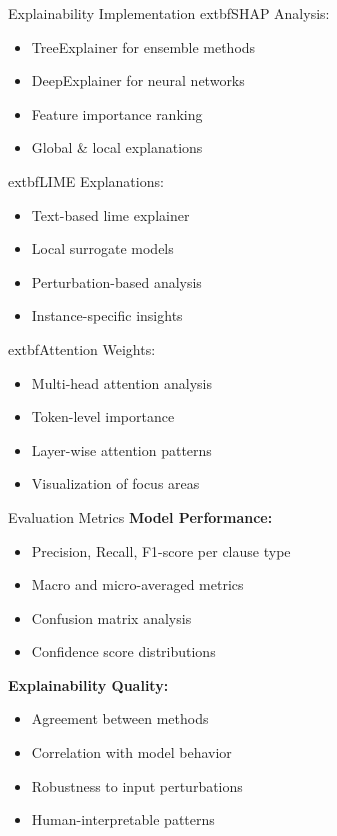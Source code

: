 \begin{frame}{Explainability Implementation}
	extbf{SHAP Analysis:}
\begin{itemize}
    \item TreeExplainer for ensemble methods
    \item DeepExplainer for neural networks
    \item Feature importance ranking
    \item Global \& local explanations
\end{itemize}

\vspace{0.3cm}
	extbf{LIME Explanations:}
\begin{itemize}
    \item Text-based lime explainer
    \item Local surrogate models  
    \item Perturbation-based analysis
    \item Instance-specific insights
\end{itemize}

\vspace{0.3cm}
	extbf{Attention Weights:}
\begin{itemize}
    \item Multi-head attention analysis
    \item Token-level importance
    \item Layer-wise attention patterns
    \item Visualization of focus areas
\end{itemize}
\end{frame}

\begin{frame}{Evaluation Metrics}
\textbf{Model Performance:}
\begin{itemize}
    \item Precision, Recall, F1-score per clause type
    \item Macro and micro-averaged metrics
    \item Confusion matrix analysis
    \item Confidence score distributions
\end{itemize}

\vspace{0.5cm}
\textbf{Explainability Quality:}
\begin{itemize}
    \item {} Agreement between methods
    \item {} Correlation with model behavior
    \item {} Robustness to input perturbations
    \item {} Human-interpretable patterns
\end{itemize}
\end{frame}
